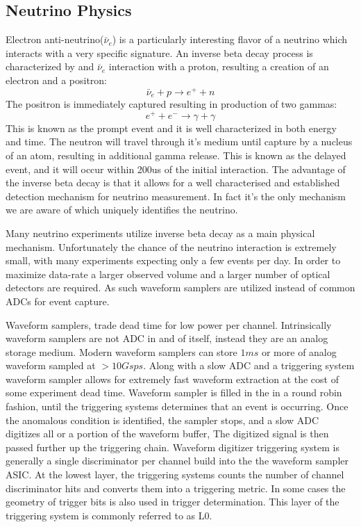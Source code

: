 \subsection{Neutrino Physics}\label{subsec:neutrino-physics}
Electron anti-neutrino($\bar{\nu}_e$) is a particularly interesting flavor of a neutrino which interacts with a very specific signature.
An inverse beta decay process is characterized by and $\bar{\nu}_e$ interaction with a proton, resulting a creation of an electron and a positron:
\begin{equation}
    \bar{\nu}_e+p\rightarrow e^++n
\end{equation}
The positron is immediately captured resulting in production of two gammas:
\begin{equation}
    e^+ +e^- \rightarrow \gamma + \gamma
\end{equation}
This is known as the prompt event and it is well characterized in both energy and time.
The neutron will travel through it's medium until capture by a nucleus of an atom, resulting in additional gamma release.
This is known as the delayed event, and it will occur within 200us of the initial interaction.
The advantage of the inverse beta decay is that it allows for a well characterised and established detection mechanism for neutrino measurement.
In fact it's the only mechanism we are aware of which uniquely identifies the neutrino.

Many neutrino experiments utilize inverse beta decay as a main physical mechanism.\cite{abe2008precision}\cite{li2016invited}
Unfortunately the chance of the neutrino interaction is extremely small, with many experiments expecting only a few events per day.
In order to maximize data-rate a larger observed volume and a larger number of optical detectors are required.
As such waveform samplers are utilized instead of common ADCs for event capture.

Waveform samplers, trade dead time for low power per channel.
Intrinsically waveform samplers are not ADC in and of itself, instead they are an analog storage medium.
Modern waveform samplers can store $1ms$ or more of analog waveform sampled at $>10Gsps$.
Along with a slow ADC and a triggering system waveform sampler allows for extremely fast waveform extraction at the cost of some experiment dead time.
Waveform sampler is filled in the in a round robin fashion, until the triggering systems determines that an event is occurring.
Once the anomalous condition is identified, the sampler stops, and a slow ADC digitizes all or a portion of the waveform buffer,
The digitized signal is then passed further up the triggering chain.
Waveform digitizer triggering system is generally a single discriminator per channel build into the the waveform sampler ASIC.
At the lowest layer, the triggering systems counts the number of channel discriminator hits and converts them into a triggering metric.
In some cases the geometry of trigger bits is also used in trigger determination.
This layer of the triggering system is commonly referred to as L0.

